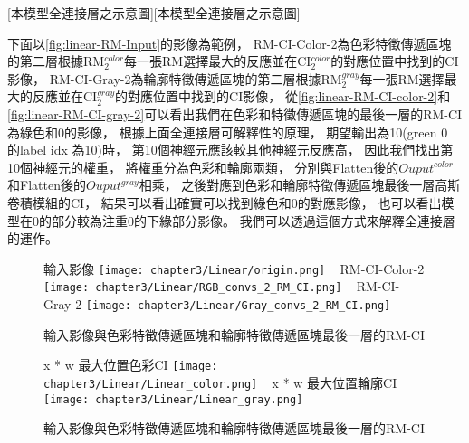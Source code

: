 \documentclass[class=NCU_thesis, crop=false]{standalone}
\begin{document}
[本模型全連接層之示意圖][本模型全連接層之示意圖]

下面以\cref{fig:linear-RM-Input}的影像為範例，
RM-CI-Color-2為色彩特徵傳遞區塊的第二層根據RM$^{color}_{2}$每一張RM選擇最大的反應並在CI$^{color}_{2}$的對應位置中找到的CI影像，
RM-CI-Gray-2為輪廓特徵傳遞區塊的第二層根據RM$^{gray}_{2}$每一張RM選擇最大的反應並在CI$^{gray}_{2}$的對應位置中找到的CI影像，
從\cref{fig:linear-RM-CI-color-2}和\cref{fig:linear-RM-CI-gray-2}可以看出我們在色彩和特徵傳遞區塊的最後一層的RM-CI為綠色和0的影像，
根據上面全連接層可解釋性的原理，
期望輸出為10(green 0 的label idx 為10)時，
第10個神經元應該較其他神經元反應高，
因此我們找出第10個神經元的權重，
將權重分為色彩和輪廓兩類，
分別與Flatten後的$Ouput^{color}$和Flatten後的$Ouput^{gray}$相乘，
之後對應到色彩和輪廓特徵傳遞區塊最後一層高斯卷積模組的CI，
結果可以看出確實可以找到綠色和0的對應影像，
也可以看出模型在0的部分較為注重0的下緣部分影像。
我們可以透過這個方式來解釋全連接層的運作。

\begin{figure}[H]
    \centering
    \subcaptionbox
        {輸入影像
        \label{fig:linear-RM-Input}}
        {\texttt{[image: chapter3/Linear/origin.png]}}
    ~
    \subcaptionbox
        {RM-CI-Color-2
        \label{fig:linear-RM-CI-color-2}}
        {\texttt{[image: chapter3/Linear/RGB\_convs\_2\_RM\_CI.png]}}
    ~
    \subcaptionbox
        {RM-CI-Gray-2
        \label{fig:linear-RM-CI-gray-2}}
        {\texttt{[image: chapter3/Linear/Gray\_convs\_2\_RM\_CI.png]}}
    \caption{輸入影像與色彩特徵傳遞區塊和輪廓特徵傳遞區塊最後一層的RM-CI\cite{YangCNNInterpretable}}
    \label{fig:RM-CI}
\end{figure}

\begin{figure}[H]
    \centering
    \subcaptionbox
        {x * w 最大位置色彩CI
        \label{fig:linear-rgb}}
        {\texttt{[image: chapter3/Linear/Linear\_color.png]}}
    ~
    \subcaptionbox
        {x * w 最大位置輪廓CI
        \label{fig:linear-gray}}
        {\texttt{[image: chapter3/Linear/Linear\_gray.png]}}
    \caption{輸入影像與色彩特徵傳遞區塊和輪廓特徵傳遞區塊最後一層的RM-CI\cite{YangCNNInterpretable}}
    \label{fig:Linear-w-x}
\end{figure}
\end{document}
